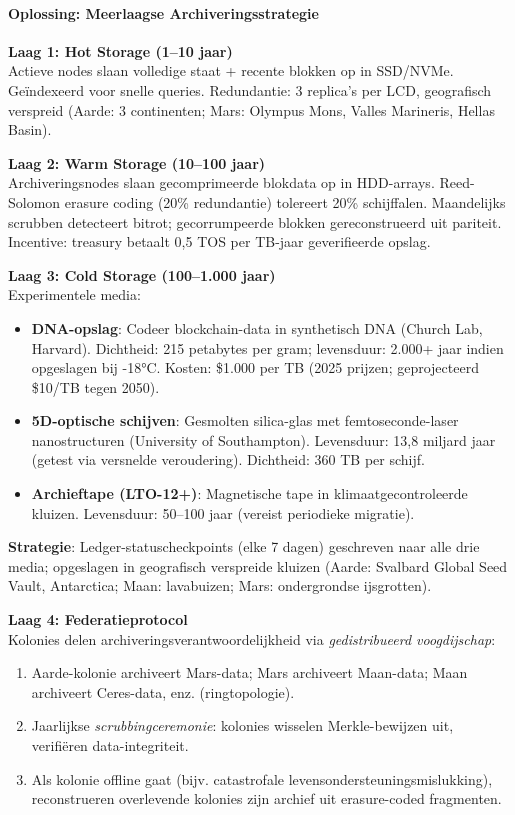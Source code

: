\documentclass[11pt]{article}
\begin{document}
\paragraph{Oplossing: Meerlaagse Archiveringsstrategie}

\textbf{Laag 1: Hot Storage (1--10 jaar)}\\
Actieve nodes slaan volledige staat + recente blokken op in SSD/NVMe. Geïndexeerd voor snelle queries. Redundantie: 3 replica's per LCD, geografisch verspreid (Aarde: 3 continenten; Mars: Olympus Mons, Valles Marineris, Hellas Basin).

\textbf{Laag 2: Warm Storage (10--100 jaar)}\\
Archiveringsnodes slaan gecomprimeerde blokdata op in HDD-arrays. Reed-Solomon erasure coding (20\% redundantie) tolereert 20\% schijffalen. Maandelijks scrubben detecteert bitrot; gecorrumpeerde blokken gereconstrueerd uit pariteit. Incentive: treasury betaalt 0,5 TOS per TB-jaar geverifieerde opslag.

\textbf{Laag 3: Cold Storage (100--1.000 jaar)}\\
Experimentele media:
\begin{itemize}[noitemsep]
  \item \textbf{DNA-opslag}: Codeer blockchain-data in synthetisch DNA (Church Lab, Harvard). Dichtheid: 215 petabytes per gram; levensduur: 2.000+ jaar indien opgeslagen bij -18°C. Kosten: \$1.000 per TB (2025 prijzen; geprojecteerd \$10/TB tegen 2050).
  \item \textbf{5D-optische schijven}: Gesmolten silica-glas met femtoseconde-laser nanostructuren (University of Southampton). Levensduur: 13,8 miljard jaar (getest via versnelde veroudering). Dichtheid: 360 TB per schijf.
  \item \textbf{Archieftape (LTO-12+)}: Magnetische tape in klimaatgecontroleerde kluizen. Levensduur: 50--100 jaar (vereist periodieke migratie).
\end{itemize}
\textbf{Strategie}: Ledger-statuscheckpoints (elke 7 dagen) geschreven naar alle drie media; opgeslagen in geografisch verspreide kluizen (Aarde: Svalbard Global Seed Vault, Antarctica; Maan: lavabuizen; Mars: ondergrondse ijsgrotten).

\textbf{Laag 4: Federatieprotocol}\\
Kolonies delen archiveringsverantwoordelijkheid via \emph{gedistribueerd voogdijschap}:
\begin{enumerate}[noitemsep]
  \item Aarde-kolonie archiveert Mars-data; Mars archiveert Maan-data; Maan archiveert Ceres-data, enz. (ringtopologie).
  \item Jaarlijkse \emph{scrubbingceremonie}: kolonies wisselen Merkle-bewijzen uit, verifiëren data-integriteit.
  \item Als kolonie offline gaat (bijv. catastrofale levensondersteuningsmislukking), reconstrueren overlevende kolonies zijn archief uit erasure-coded fragmenten.
\end{enumerate}
\end{document}
